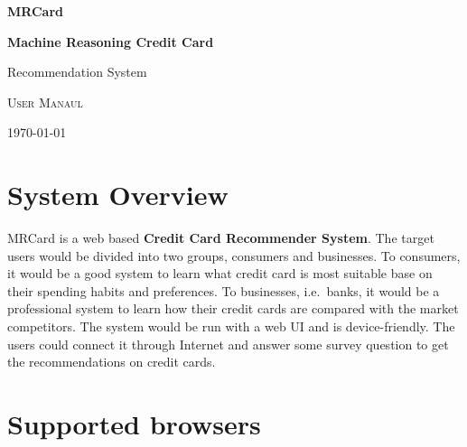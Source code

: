 \documentclass[12pt]{article}
\begin{document}
\begin{titlepage}


\thispagestyle{empty}
\setlength\headheight{0pt}
\begin{center}

    \vspace*{6.25cm}

    {\Large\bfseries MRCard}

    \vspace{0.5cm}

    {\large\bfseries Machine Reasoning Credit Card \par Recommendation System}

    \vspace{1cm}

    {\scshape\Large User Manaul\par}

    \vspace{1cm}



    \vspace{4.5cm}




\large
\today

\end{center}

\clearpage
\restoregeometry
\end{titlepage}

\justify

	\section{System Overview}
	MRCard is a web based \textbf{Credit Card Recommender System}. The target users would be divided into two groups, consumers and businesses. To consumers, it would be a good system to learn what credit card is most suitable base on their spending habits and preferences. To businesses, i.e.\ banks, it would be a professional system to learn how their credit cards are compared with the market competitors. The system would be run with a web UI and is device-friendly. The users could connect it through Internet and answer some survey question to get the recommendations on credit cards.

	\section{Supported browsers}
\end{document}
